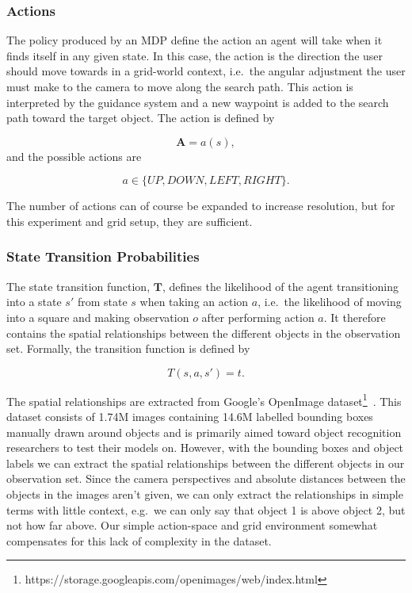\documentclass[a4paper, twoside]{article}
\begin{document}
\subsubsection{Actions}

The policy produced by an MDP define the action an agent will take when it finds itself in any given state. In this case, the action is the direction the user should move towards in a grid-world context, i.e.\ the angular adjustment the user must make to the camera to move along the search path. This action is interpreted by the guidance system and a new waypoint is added to the search path toward the target object. The action is defined by

\begin{equation}
  \mathbf{A} = a(s),
\end{equation}
and the possible actions are

\begin{equation}
  a\in \{UP, DOWN, LEFT, RIGHT\}.
\end{equation}

The number of actions can of course be expanded to increase resolution, but for this experiment and grid setup, they are sufficient. 

\subsubsection{State Transition Probabilities}

\noindent The state transition function, $\mathbf{T}$, defines the likelihood of the agent transitioning into a state $s'$ from state $s$ when taking an action $a$, i.e.\ the likelihood of moving into a square and making observation $o$ after performing action $a$. It therefore contains the spatial relationships between the different objects in the observation set. Formally, the transition function is defined by

\begin{equation}
  T(s, a, s') = t.
\end{equation}

The spatial relationships are extracted from Google's OpenImage dataset\footnote{https://storage.googleapis.com/openimages/web/index.html}~\cite{openimages}. This dataset consists of 1.74M images containing 14.6M labelled bounding boxes manually drawn around objects and is primarily aimed toward object recognition researchers to test their models on. However, with the bounding boxes and object labels we can extract the spatial relationships between the different objects in our observation set. Since the camera perspectives and absolute distances between the objects in the images aren't given, we can only extract the relationships in simple terms with little context, e.g.\ we can only say that object 1 is above object 2, but not how far above. Our simple action-space and grid environment somewhat compensates for this lack of complexity in the dataset. 
\end{document}
